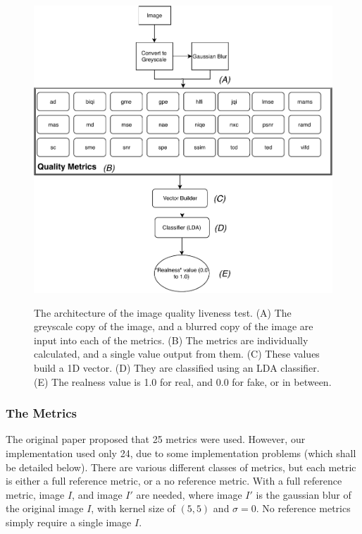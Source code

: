 \documentclass[10pt,a4paper]{article}
\begin{document}
            \begin{figure}
                \centering
                \includegraphics[width=\linewidth]{ImageQualityLivenessTest.pdf}
                \label{ImageQualityLivenessTestDiagram}
                \caption{The architecture of the image quality liveness test. (A) The greyscale copy of the image, and a blurred copy of the image are input into each of the metrics.
                (B) The metrics are individually calculated, and a single value output from them. (C) These values build a 1D vector. (D) They are classified using an LDA classifier. (E) The realness value
                is 1.0 for real, and 0.0 for fake, or in between.}
            \end{figure}
    
            \subsubsection{The Metrics}
            The original paper proposed that 25 metrics were used. However, our implementation used only 24, due to some implementation problems (which shall be detailed below).
            There are various different classes of metrics, but each metric is either a full reference metric, or a no reference metric. With a full reference metric, image $I$, and image $I'$ are needed,
            where image $I'$ is the gaussian blur of the original image $I$, with kernel size of $(5,5)$ and $\sigma = 0$. No reference metrics simply require a single image $I$.
\end{document}
